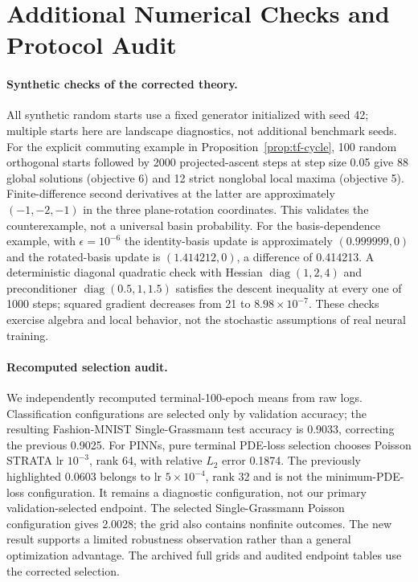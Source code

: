 \section{Additional Numerical Checks and Protocol Audit}
\label{app:revision-audit}
\paragraph{Synthetic checks of the corrected theory.}
All synthetic random starts use a fixed generator initialized with seed 42; multiple starts here are landscape diagnostics, not additional benchmark seeds. For the explicit commuting example in Proposition~\ref{prop:tf-cycle}, 100 random orthogonal starts followed by 2000 projected-ascent steps at step size 0.05 give 88 global solutions (objective 6) and 12 strict nonglobal local maxima (objective 5). Finite-difference second derivatives at the latter are approximately $(-1,-2,-1)$ in the three plane-rotation coordinates. This validates the counterexample, not a universal basin probability. For the basis-dependence example, with $\epsilon=10^{-6}$ the identity-basis update is approximately $(0.999999,0)$ and the rotated-basis update is $(1.414212,0)$, a difference of 0.414213. A deterministic diagonal quadratic check with Hessian $\operatorname{diag}(1,2,4)$ and preconditioner $\operatorname{diag}(0.5,1,1.5)$ satisfies the descent inequality at every one of 1000 steps; squared gradient decreases from 21 to $8.98\times10^{-7}$. These checks exercise algebra and local behavior, not the stochastic assumptions of real neural training.

\paragraph{Recomputed selection audit.}
We independently recomputed terminal-100-epoch means from raw logs. Classification configurations are selected only by validation accuracy; the resulting Fashion-MNIST Single-Grassmann test accuracy is 0.9033, correcting the previous 0.9025. For PINNs, pure terminal PDE-loss selection chooses Poisson STRATA lr $10^{-3}$, rank 64, with relative $L_2$ error 0.1874. The previously highlighted 0.0603 belongs to lr $5\times10^{-4}$, rank 32 and is not the minimum-PDE-loss configuration. It remains a diagnostic configuration, not our primary validation-selected endpoint. The selected Single-Grassmann Poisson configuration gives 2.0028; the grid also contains nonfinite outcomes. The new result supports a limited robustness observation rather than a general optimization advantage. The archived full grids and audited endpoint tables use the corrected selection.

